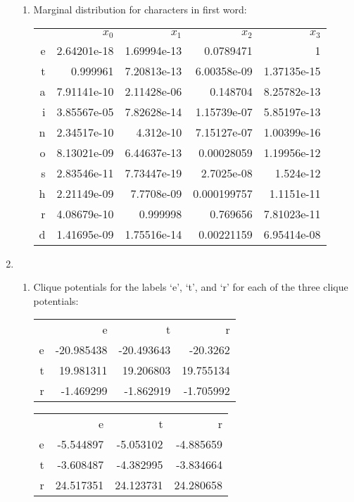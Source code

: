 \documentclass[12pt]{article}
\begin{document}
\begin{enumerate}
\begin{enumerate}
\item %
Marginal distribution for characters in first word:
\begin{center}
\begin{tabular}{rrrrr}
 & $x_0$ & $x_1$ & $x_2$ & $x_3$ \\
e  & 2.64201e-18 & 1.69994e-13 & 0.0789471 & 1 \\
t  & 0.999961 & 7.20813e-13 & 6.00358e-09 & 1.37135e-15 \\
a  & 7.91141e-10 & 2.11428e-06 & 0.148704 & 8.25782e-13 \\
i  & 3.85567e-05 & 7.82628e-14 & 1.15739e-07 & 5.85197e-13 \\
n  & 2.34517e-10 & 4.312e-10 & 7.15127e-07 & 1.00399e-16 \\
o  & 8.13021e-09 & 6.44637e-13 & 0.00028059 & 1.19956e-12 \\
s  & 2.83546e-11 & 7.73447e-19 & 2.7025e-08 & 1.524e-12 \\
h  & 2.21149e-09 & 7.7708e-09 & 0.000199757 & 1.1151e-11 \\
r  & 4.08679e-10 & 0.999998 & 0.769656 & 7.81023e-11 \\
d  & 1.41695e-09 & 1.75516e-14 & 0.00221159 & 6.95414e-08 \\
\end{tabular}
\end{center}

\end{enumerate}

\item %
\begin{enumerate}
\item %
Clique potentials for the labels `e', `t', and `r' for each of the three clique potentials:

\begin{center}
\begin{tabular}{rrrr}
& e & t & r \\
e & -20.985438 & -20.493643 & -20.3262 \\
t & 19.981311 & 19.206803 & 19.755134 \\
r & -1.469299 & -1.862919 & -1.705992
\end{tabular}
\end{center}

\begin{center}
\begin{tabular}{rrrr}
& e & t & r \\
e & -5.544897 & -5.053102 & -4.885659 \\
t & -3.608487 & -4.382995 & -3.834664 \\
r & 24.517351 & 24.123731 & 24.280658
\end{tabular}
\end{center}


\end{enumerate}
\end{enumerate}
\end{document}
